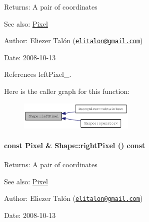\begin{Desc}
\item[Returns:]A pair of coordinates\end{Desc}
\begin{Desc}
\item[See also:]\hyperlink{_shape_8hpp_535e59456e3e633842529cfa8ea103c4}{Pixel}\end{Desc}
\begin{Desc}
\item[Author:]Eliezer Talón (\href{mailto:elitalon@gmail.com}{\tt elitalon@gmail.com}) \end{Desc}
\begin{Desc}
\item[Date:]2008-10-13 \end{Desc}


References leftPixel\_\-.

Here is the caller graph for this function:\nopagebreak
\begin{figure}[H]
\begin{center}
\leavevmode
\includegraphics[width=156pt]{class_shape_53d49d362234068aad0b80986fabb85d_icgraph}
\end{center}
\end{figure}
\hypertarget{class_shape_c265e43fa90ee2ab7c9cd3a3d1e96d82}{
\paragraph[rightPixel]{\setlength{\rightskip}{0pt plus 5cm}const {\bf Pixel} \& Shape::rightPixel () const}\hfill}
\label{class_shape_c265e43fa90ee2ab7c9cd3a3d1e96d82}


\begin{Desc}
\item[Returns:]A pair of coordinates\end{Desc}
\begin{Desc}
\item[See also:]\hyperlink{_shape_8hpp_535e59456e3e633842529cfa8ea103c4}{Pixel}\end{Desc}
\begin{Desc}
\item[Author:]Eliezer Talón (\href{mailto:elitalon@gmail.com}{\tt elitalon@gmail.com}) \end{Desc}
\begin{Desc}
\item[Date:]2008-10-13 \end{Desc}


